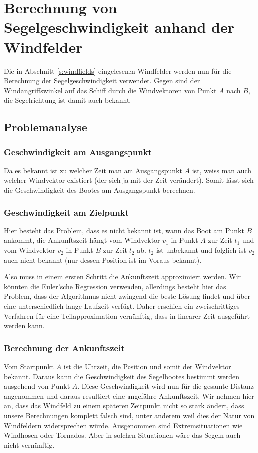 
\section{Berechnung von Segelgeschwindigkeit anhand der Windfelder}
Die in Abschnitt \ref{s:windfields} eingelesenen Windfelder werden nun
für die Berechnung der Segelgeschwindigkeit verwendet. Gegen sind der
Windangriffswinkel auf das Schiff durch die Windvektoren von Punkt $A$
nach $B$, die Segelrichtung ist damit auch bekannt.

 
\subsection{Problemanalyse}
\subsubsection{Geschwindigkeit am Ausgangspunkt}
Da es bekannt ist zu welcher Zeit man am Ausgangspunkt $A$ ist, weiss
man auch welcher Windvektor existiert (der sich ja mit der Zeit
verändert). Somit lässt sich die Geschwindigkeit des Bootes am
Ausgangspunkt berechnen.

\subsubsection{Geschwindigkeit am Zielpunkt}
Hier besteht das Problem, dass es nicht bekannt ist, wann das Boot am
Punkt $B$ ankommt, die Ankunftszeit hängt vom Windvektor $v_{1}$ in
Punkt $A$ zur Zeit $t_{1}$ und vom Windvektor $v_{2}$ in Punkt $B$ zur
Zeit $t_{2}$ ab. $t_{2}$ ist unbekannt und folglich ist $v_{2}$ auch
nicht bekannt (nur dessen Position ist im Voraus bekannt).

Also muss in einem ersten Schritt die Ankunftszeit approximiert werden.
Wir könnten die Euler'sche Regression verwenden, allerdings besteht hier
das Problem, dass der Algorithmus nicht zwingend die beste Lösung findet
und über eine unterschiedlich lange Laufzeit verfügt. Daher erschien ein
zweischrittiges Verfahren für eine Teilapproximation vernünftig, dass in
linearer Zeit ausgeführt werden kann.

\subsubsection{Berechnung der Ankunftszeit}
Vom Startpunkt $A$ ist die Uhrzeit, die Position und somit der
Windvektor bekannt. Daraus kann die Geschwindigkeit des Segelbootes
bestimmt werden ausgehend von Punkt $A$. Diese Geschwindigkeit wird nun
für die gesamte Distanz angenommen und daraus resultiert eine ungefähre
Ankunftszeit. Wir nehmen hier an, dass das Windfeld zu einem späteren
Zeitpunkt nicht so stark ändert, dass unsere Berechnungen komplett
falsch sind, unter anderem weil dies der Natur von Windfeldern
widersprechen würde. Ausgenommen sind Extremsituationen wie Windhosen
oder Tornados. Aber in solchen Situationen wäre das Segeln auch nicht
vernünftig.

